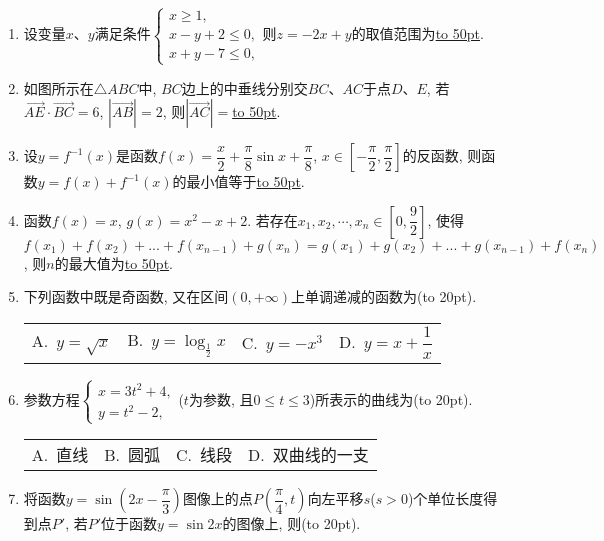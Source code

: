 \documentclass[10pt,a4paper]{article}
\newcommand{\blank}[1]{\underline{\hbox to #1pt{}}}
\newcommand{\bracket}[1]{(\hbox to #1pt{})}
\newcommand{\fourch}[4]{\par\begin{tabular}{p{.23\textwidth}p{.23\textwidth}p{.23\textwidth}p{.23\textwidth}}
A.~#1 &B.~#2& C.~#3& D.~#4
\end{tabular}}
\begin{document}
\begin{enumerate}[1.]
\begin{center}
\end{center}
\item 设变量$x$、$y$满足条件$\begin{cases} x\ge 1,\\ x-y+2\le 0,\\ x+y-7\le 0, \end{cases}$则$z=-2x+y$的取值范围为\blank{50}.
\item 如图所示在$\triangle ABC$中, $BC$边上的中垂线分别交$BC$、$AC$于点$D$、$E$, 若$\overrightarrow{AE}\cdot \overrightarrow{BC}=6$, $|\overrightarrow{AB}|=2$, 则$|\overrightarrow{AC}|=$\blank{50}.
\begin{center}
\end{center}
\item 设$y=f^{-1}(x)$是函数$f(x)=\dfrac x2+\dfrac{\pi}8\sin x+\dfrac{\pi}8$, $x\in [-\dfrac{\pi }2,\dfrac{\pi }2]$的反函数, 则函数$y=f(x)+f^{-1}(x)$的最小值等于\blank{50}.
\item 函数$f(x)=x$, $g(x)=x^2-x+2$. 若存在$x_1, x_2,\cdots,x_n\in [0,\dfrac 92]$, 使得$f(x_1)+f(x_2)+...+f(x_{n-1})+g(x_n)=g(x_1)+g(x_2)+...+g(x_{n-1})+f(x_n)$, 则$n$的最大值为\blank{50}.
\item 下列函数中既是奇函数, 又在区间$(0,+\infty)$上单调递减的函数为\bracket{20}.
\fourch{$y=\sqrt x$}{$y=\log_{\frac 12}x$}{$y=-x^3$}{$y=x+\dfrac 1x$}
\item 参数方程$\begin{cases} x=3t^2+4,\\ y=t^2-2, \end{cases}$($t$为参数, 且$0\le t\le 3$)所表示的曲线为\bracket{20}.
\fourch{直线}{圆弧}{线段}{双曲线的一支}
\item 将函数$y=\sin (2x-\dfrac{\pi}3)$图像上的点$P(\dfrac{\pi}4,t)$向左平移$s$($s>0$)个单位长度得到点$P'$, 若$P'$位于函数$y=\sin 2x$的图像上, 则\bracket{20}.

\end{enumerate}
\end{document}
